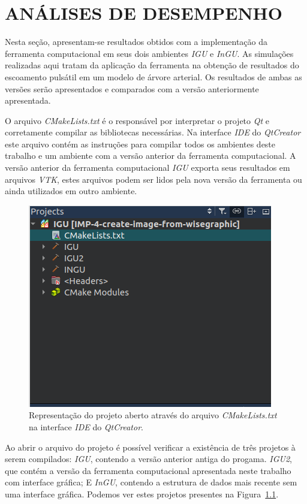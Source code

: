 \chapter{ANÁLISES DE DESEMPENHO}\label{sec:resultados2}
\justifying

Nesta seção, apresentam-se resultados obtidos com a implementação da ferramenta computacional em seus dois ambientes \textit{IGU} e \textit{InGU}. As simulações realizadas aqui tratam da aplicação da ferramenta na obtenção de resultados do escoamento pulsátil em um modelo de árvore arterial. Os resultados de ambas as versões serão apresentados e comparados com a versão anteriormente apresentada.

O arquivo \textit{CMakeLists.txt} é o responsável por interpretar o projeto \textit{Qt} e corretamente compilar as bibliotecas necessárias. Na interface \textit{IDE} do \textit{QtCreator} este arquivo contém as instruções para compilar todos os ambientes deste trabalho e um ambiente com a versão anterior da ferramenta computacional. A versão anterior da ferramenta computacional \textit{IGU} exporta seus resultados em arquivos \textit{VTK}, estes arquivos podem ser lidos pela nova versão da ferramenta ou ainda utilizados em outro ambiente.


\begin{figure}[!htbp]
	\centering
	\includegraphics[scale=1.5]{Figures/cmake_print.png}
	\caption{Representação do projeto aberto através do arquivo \textit{CMakeLists.txt} na interface \textit{IDE} do \textit{QtCreator}.}
	\label{fig:cmake}
\end{figure}


Ao abrir o arquivo do projeto é possível verificar a existência de três projetos à serem compilados: \textit{IGU}, contendo a versão anterior antiga do progama. \textit{IGU2}, que contém a versão da ferramenta computacional apresentada neste trabalho com interface gráfica; E \textit{InGU}, contendo a estrutura de dados mais recente sem uma interface gráfica. Podemos ver estes projetos presentes na Figura~\ref{fig:cmake}.

